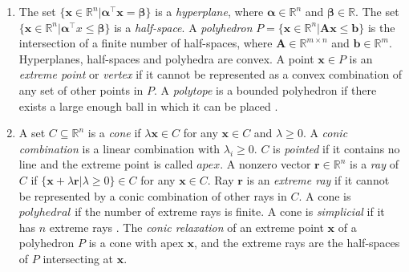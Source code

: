 \begin{enumerate}
    \item The set $\{\mathbf x \in \mathbb{R}^n | \boldsymbol \alpha^\intercal \mathbf x = \boldsymbol \beta \}$ is a \textit{hyperplane}, where $\boldsymbol \alpha \in \mathbb{R}^n$ and $\boldsymbol \beta \in \mathbb{R}$. The set $\{\mathbf x \in \mathbb{R}^n | \boldsymbol \alpha^\intercal x \leq \boldsymbol \beta \}$ is a \textit{half-space}. %
    A \textit{polyhedron} $P = \{ \mathbf x \in \mathbb{R}^n | \mathbf A \mathbf x \leq \mathbf b\}$ is the intersection of a finite number of half-spaces, where $\mathbf A \in \mathbb{R}^{m \times n}$ and $\mathbf b \in \mathbb{R}^m$. Hyperplanes, half-spaces and polyhedra are convex. A point $\mathbf x \in P$ is an \textit{extreme point} or \textit{vertex} if it cannot be represented as a convex combination of any set of other points in $P$. %
    A \textit{polytope} is a bounded polyhedron if there exists a large enough ball in which it can be placed \cite{understanding_lp}.

    \item A set $C \subseteq \mathbb{R}^n$ is a \textit{cone} if $\lambda \mathbf x \in C$ for any $\mathbf x \in C$ and $\lambda \geq 0$. A \textit{conic combination} is a linear combination with $\lambda_i \geq 0$. %
    $C$ is \textit{pointed} if it contains no line and the extreme point is called $apex$. A nonzero vector $\mathbf r \in \mathbb{R}^n$ is a \textit{ray} of $C$ if $\{\mathbf x + \lambda \mathbf r | \lambda \geq 0 \} \in C$ for any $\mathbf x \in C$. Ray $\mathbf r$ is an \textit{extreme ray} if it cannot be represented by a conic combination of other rays in $C$. 
    A cone is $polyhedral$ if the number of extreme rays is finite. A cone is \textit{simplicial} if it has $n$ extreme rays \cite{bienstock_outer_product_free_sets}. 
    The \textit{conic relaxation} of an extreme point $\mathbf x$ of a polyhedron $P$ is a cone with apex $\mathbf x$, and the extreme rays are the half-spaces of $P$ intersecting at $\mathbf x$.
    

\end{enumerate}
